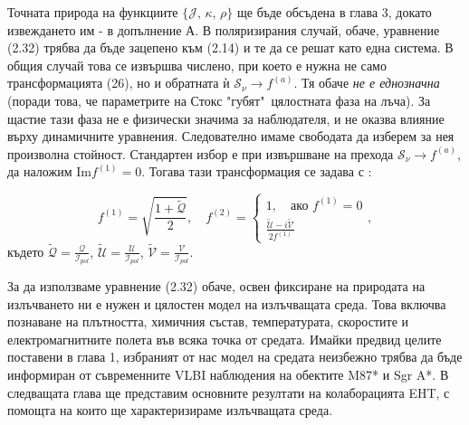 \noindent Точната природа на функциите $\{\mathcal{J},\,\mathcal{\kappa},\,\mathcal{\rho}\}$ ще бъде обсъдена в глава 3, докато извеждането им - в допълнение А. В поляризирания случай, обаче, уравнение (2.32) трябва да бъде зацепено към (2.14) и те да се решат като една система. В общия случай това се извършва числено, при което е нужна не само трансформацията (26), но и обратната ѝ $\mathcal{S}_\nu\rightarrow f^{(a)}$. Тя обаче \emph{не е еднозначна} (поради това, че параметрите на Стокс "губят"$\,$ цялостната фаза на лъча). За щастие тази фаза не е физически значима за наблюдателя, и не оказва влияние върху динамичните уравнения. Следователно имаме свободата да изберем за нея произволна стойност. Стандартен избор е при извършване на прехода $\mathcal{S}_\nu\rightarrow f^{(a)}$, да наложим $\text{Im}{f^{(1)}} = 0$. Тогава тази трансформация се задава с \cite{Bronzwaer2020}:

\begin{equation}
	f^{(1)} = \sqrt{\frac{1 + \tilde{\mathcal{Q}}}{2}}, \quad f^{(2)} = \begin{cases}
		1,\quad \text{ако}\,\,f^{(1)} = 0 \\
		\frac{\tilde{\mathcal{U}} - i\tilde{\mathcal{V}}}{2f^{(1)}}
	\end{cases},
\end{equation}
където $\tilde{\mathcal{Q}} = \frac{\mathcal{Q}}{\mathcal{I}_{pol}}$, $\tilde{\mathcal{U}} = \frac{\mathcal{U}}{\mathcal{I}_{pol}}$, $\tilde{\mathcal{V}} = \frac{\mathcal{V}}{\mathcal{I}_{pol}}$.\\

\noindent За да използваме уравнение (2.32) обаче, освен фиксиране на природата на излъчването ни е нужен и цялостен модел на излъчващата среда. Това включва познаване на плътността, химичния състав, температурата, скоростите и електромагнитните полета във всяка точка от средата. Имайки предвид целите поставени в глава 1, избраният от нас модел на средата неизбежно трябва да бъде информиран от съвременните VLBI наблюдения на обектите M87* и Sgr A*. В следващата глава ще представим основните резултати на колаборацията EHT, с помощта на които ще характеризираме излъчващата среда.
\lfoot{}

